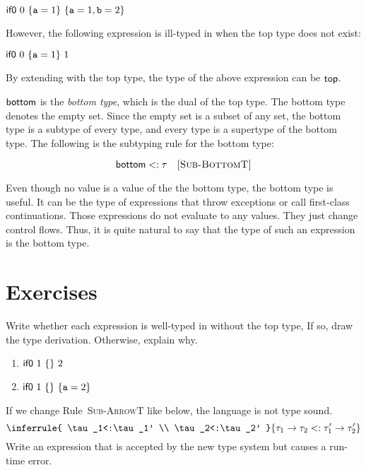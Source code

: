 $\textsf{if0}\ 0\ \{\texttt{a}=1\}\ \{\texttt{a}=1,\texttt{b}=2\}$

However, the following expression is ill-typed in \Lang when the top type does
not exist:

$\textsf{if0}\ 0\ \{\texttt{a}=1\}\ 1$

By extending \Lang with the top type, the type of the above expression can be
$\textsf{top}$.

$\textsf{bottom}$ is the \textit{bottom type}, which is the dual of
the top type. The bottom type denotes the empty set. Since the empty set is a subset of
any set, the bottom type is a subtype of every type, and
every type is a supertype of the bottom type. The following is the subtyping rule
for the bottom type:


\[
  \textsf{bottom}<:\tau
  \quad\textsc{[Sub-BottomT]}
\]

Even though no value is a value of the the bottom type,
the bottom type is useful. It can be the type of
expressions that throw exceptions or call first-class continuations. Those
expressions do not evaluate to any values. They just change control flows.
Thus, it is quite natural to say that the type of such an expression
is the bottom type.

\section{Exercises}

\begin{exercise}

Write whether each expression is well-typed in \Lang without the top type,
If so, draw the type derivation. Otherwise, explain why.
\begin{enumerate}
\item $\textsf{if0}\ 1\ \{ \}\ 2$
\item $\textsf{if0}\ 1\ \{ \}\ \{\texttt{a}=2\}$
\end{enumerate}

\end{exercise}

\begin{exercise}

If we change Rule~\textsc{Sub-ArrowT} like below, the language is not type
  sound.
  \[
    \inferrule
    { \tau_1<:\tau_1' \\ \tau_2<:\tau_2' }
    { \tau_1\rightarrow\tau_2<:\tau_1'\rightarrow\tau_2' }
  \]
Write an expression that is accepted by the new type system but
causes a run-time error.

\end{exercise}

